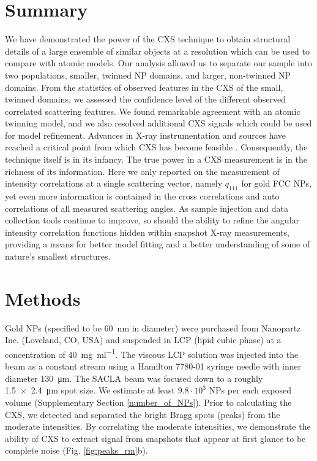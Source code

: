 \documentclass [12pt,fleqn]{article}
\begin{document}
\section{Summary}
We have demonstrated the power of the CXS technique to obtain structural details of a large ensemble of similar objects at a resolution which can be used to compare with atomic models. Our analysis allowed us to separate our sample into two populations, smaller, twinned NP domains, and larger, non-twinned NP domains. From the statistics of observed features in the CXS of the small, twinned domains, we assessed the confidence level of the different observed correlated scattering features. We found remarkable agreement with an atomic twinning model, and we also resolved additional CXS signals which could be used for model refinement. Advances in X-ray instrumentation and sources have reached a critical point from which CXS has become feasible \cite{emma2010first, ishikawa2012compact}. Consequently, the technique itself is in its infancy. The true power in a CXS measurement is in the richness of its information. Here we only reported on the measurement of intensity correlations at a single scattering vector, namely $q_{111}$ for gold FCC NPs, yet even more information is contained in the cross correlations and auto correlations of all measured scattering angles. As sample injection and data collection tools continue to improve, so should the ability to refine the angular intensity correlation functions hidden within snapshot X-ray measurements, providing a means for better model fitting and a better understanding of some of nature's smallest structures.

\section{Methods}
Gold NPs (specified to be \SI{60}{\nm} in diameter) were purchased from Nanopartz Inc. (Loveland, CO, USA) and suspended in LCP (lipid cubic phase) \cite{ai2000membrane, cheng1998simple, caffrey2009crystallizing, misquitta2003detergents} at a concentration of \SI{40}{\mg \per \ml}. The viscous LCP solution was injected into the beam as a constant stream using a Hamilton 7780-01 syringe needle with inner diameter \SI{130}{\micro \meter}. The SACLA beam was focused down to a roughly \SI{1.5x2.4}{\micro \meter} spot size. We estimate at least $9.8\cdot10^3$ NPs per each exposed volume (Supplementary Section \ref{number_of_NPs}). Prior to calculating the CXS, we detected and separated the bright Bragg spots (peaks) from the moderate intensities. By correlating the moderate intensities, we demonstrate the ability of CXS to extract signal from snapshots that appear at first glance to be complete noise (Fig. \ref{fig:peaks_rm}b).
\end{document}
